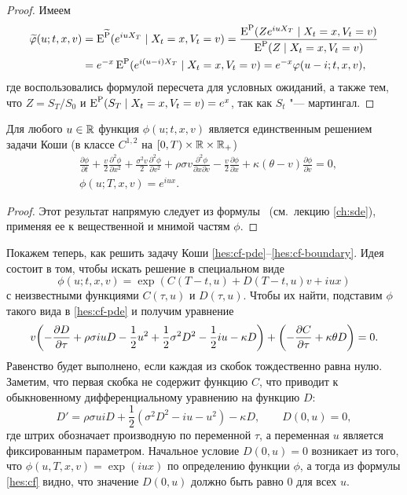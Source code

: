 \begin{proof}
Имеем
\[
\begin{split}
\widetilde{\varphi}(u; t,x,v) &= \operatorname{E}^{\widetilde{\mathrm{P}}} (e^{iu X_T}  \mid X_t=x, V_t = v)
= \frac{\operatorname{E}^{\mathrm{P}} (Z e^{iu X_T} \mid X_t=x, V_t = v)}{\operatorname{E}^{\mathrm{P}}(Z \mid X_t=x,V_t=v)} \\
&= e^{-x} \operatorname{E}^{\mathrm{P}} (e^{i(u-i)X_T} \mid X_t=x, V_t = v)
= e^{-x}\varphi(u-i; t,x,v),
\end{split}
\]
где воспользовались формулой пересчета для условных ожиданий, а также тем, что $Z=S_T/S_0$ и $\operatorname{E}^{\mathrm{P}}(S_T  \mid X_t=x, V_t = v) = e^x$, так как $S_t$ "--- мартингал.
\end{proof}

\begin{lemma}
Для любого $u\in \mathbb{R}$ функция $\phi(u;t,x,v)$ является единственным решением задачи Коши (в классе $C^{1,2}$ на $[0,T)\times\mathbb{R}\times\mathbb{R}_+$)
\begin{align}
\label{hes:cf-pde}
&\frac{\partial\phi}{\partial t} + \frac v2 \frac{\partial^2 \phi}{\partial x^2}  +\frac{\sigma^2v}{2} \frac{\partial^2\phi}{\partial v^2}
  + \rho\sigma v \frac{\partial^2\phi}{\partial x\partial v} -\frac v2 \frac{\partial \phi}{\partial x} 
  + \kappa(\theta-  v)\frac{\partial\phi}{\partial v} = 0,\\
\label{hes:cf-boundary}
&\phi(u;T,x,v) = e^{iu x}.
\end{align}
\end{lemma}

\begin{proof}
Этот результат напрямую следует из формулы \fc\ (см.~лекцию \ref{ch:sde}), применяя ее к вещественной и мнимой частям $\phi$.
\end{proof}

Покажем теперь, как решить задачу Коши \eqref{hes:cf-pde}--\eqref{hes:cf-boundary}.
Идея состоит в том, чтобы искать решение в специальном виде
\begin{equation}
\label{hes:cf}
\phi(u; t,x,v) = \exp(C(T-t,u) + D(T-t,u)v + iu x)
\end{equation}
с неизвестными функциями $C(\tau,u)$ и $D(\tau,u)$.
Чтобы их найти, подставим $\phi$ такого вида в \eqref{hes:cf-pde} и получим уравнение
\begin{equation}
\label{hes:CD-equation}
v\biggl(
  -\frac{\partial D}{\partial \tau} + \rho\sigma iu D - \frac12 u^2 
  + \frac12 \sigma^2 D^2 -\frac12 iu-\kappa D
\biggr) + \biggl(-\frac{\partial C}{\partial \tau} + \kappa\theta D\biggr) = 0.
\end{equation}
Равенство будет выполнено, если каждая из скобок тождественно равна нулю.
Заметим, что первая скобка не содержит функцию $C$, что приводит к обыкновенному дифференциальному уравнению на функцию $D$:
\[
D' = \rho\sigma ui D + \frac12 (\sigma^2 D^2 - iu - u^2) - \kappa D, \qquad D(0,u)=0,
\]
где штрих обозначает производную по переменной $\tau$, а переменная $u$ является фиксированным параметром.
Начальное условие $D(0,u)=0$ возникает из того, что $\phi(u,T,x,v) = \exp(iux)$ по определению функции $\phi$, а тогда из формулы \eqref{hes:cf} видно, что значение $D(0,u)$ должно быть равно 0 для всех $u$.

